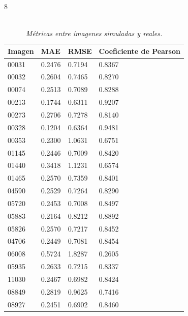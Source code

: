             \begin{table}[H]
                \caption{\doublespacing \\ \textit{Métricas entre ímagenes simuladas y reales.}}
                \begin{spacing}{8}
                    \fontsize{8pt}{2pt}\selectfont  
                    \begin{tabularx}{\linewidth}{*{4}{X}} 
                        \toprule
                        \textbf{Imagen} & \textbf{MAE} & \textbf{RMSE} & \textbf{Coeficiente de Pearson} \\ 
                        \midrule
                        00031 & 0.2476 & 0.7194 & 0.8367 \\ 
                        00032 & 0.2604 & 0.7465 & 0.8270 \\ 
                        00074 & 0.2513 & 0.7089 & 0.8288 \\
                        00213 & 0.1744 & 0.6311 & 0.9207 \\ 
                        00273 & 0.2706 & 0.7278 & 0.8140 \\
                        00328 & 0.1204 & 0.6364 & 0.9481 \\ 
                        00353 & 0.2300 & 1.0631 & 0.6751 \\ 
                        01145 & 0.2446 & 0.7009 & 0.8420 \\
                        01440 & 0.3418 & 1.1231 & 0.6574 \\ 
                        01465 & 0.2570 & 0.7359 & 0.8401 \\ 
                        04590 & 0.2529 & 0.7264 & 0.8290 \\ 
                        05720 & 0.2453 & 0.7008 & 0.8497 \\ 
                        05883 & 0.2164 & 0.8212 & 0.8892 \\ 
                        05826 & 0.2570 & 0.7217 & 0.8452 \\ 
                        04706 & 0.2449 & 0.7081 & 0.8454 \\ 
                        06008 & 0.5724 & 1.8287 & 0.2605 \\ 
                        05935 & 0.2633 & 0.7215 & 0.8337 \\ 
                        11030 & 0.2467 & 0.6982 & 0.8424 \\ 
                        08849 & 0.2819 & 0.9625 & 0.7416 \\ 
                        08927 & 0.2451 & 0.6902 & 0.8460 \\ 

\end{tabularx}
\end{spacing}
\end{table}
